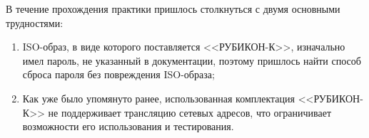 В течение прохождения практики пришлось столкнуться с двумя основными трудностями:
\begin{enumerate}
	\item ISO-образ, в виде которого поставляется <<РУБИКОН-К>>, изначально имел пароль, не указанный в документации, поэтому пришлось найти способ сброса пароля без повреждения ISO-образа;
	
	\item Как уже было упомянуто ранее, использованная комплектация <<РУБИКОН-К>> не поддерживает трансляцию сетевых адресов, что ограничивает возможности его использования и тестирования.
\end{enumerate}

\printbibliography[heading=bibintoc, title={Список использованных источников}]

